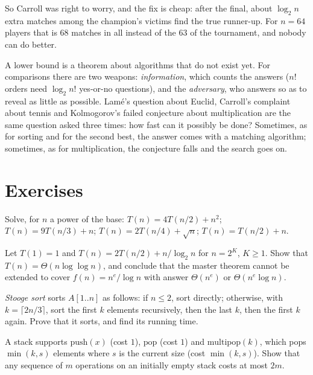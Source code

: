 So Carroll was right to worry, and the fix is cheap: after the final, about $\log_2n$ extra matches among the champion's victims find the true
runner-up. For $n=64$ players that is $68$ matches in all instead of the $63$ of the tournament, and nobody can do better.

\begin{beauty}
A lower bound is a theorem about algorithms that do not exist yet. For comparisons there are two weapons: \emph{information}, which counts
the answers ($n!$ orders need $\log_2n!$ yes-or-no questions), and the \emph{adversary}, who answers so as to reveal as little as possible.
Lam\'e's question about Euclid, Carroll's complaint about tennis and Kolmogorov's failed conjecture about multiplication are the same
question asked three times: how fast can it possibly be done? Sometimes, as for sorting and for the second best, the answer comes with a
matching algorithm; sometimes, as for multiplication, the conjecture falls and the search goes on.
\end{beauty}

\section{Exercises}

\begin{exercise}[$\star$]\label{ex:recsolve}
Solve, for $n$ a power of the base: $T(n)=4T(n/2)+n^2$; $T(n)=9T(n/3)+n$; $T(n)=2T(n/4)+\sqrt n$; $T(n)=T(n/2)+n$.
\end{exercise}

\begin{exercise}[$\star$]\label{ex:gap}
Let $T(1)=1$ and $T(n)=2T(n/2)+n/\log_2n$ for $n=2^K$, $K\ge1$. Show that $T(n)=\Theta(n\log\log n)$, and conclude that the master theorem
cannot be extended to cover $f(n)=n^e/\log n$ with answer $\Theta(n^e)$ or $\Theta(n^e\log n)$.
\end{exercise}

\begin{exercise}[$\star\star$]\label{ex:stooge}
\emph{Stooge sort} sorts $A[1..n]$ as follows: if $n\le2$, sort directly; otherwise, with $k=\lceil2n/3\rceil$, sort the first $k$ elements
recursively, then the last $k$, then the first $k$ again. Prove that it sorts, and find its running time.
\end{exercise}

\begin{exercise}[$\star$]\label{ex:multipop}
A stack supports $\mathrm{push}(x)$ (cost $1$), $\mathrm{pop}$ (cost $1$) and $\mathrm{multipop}(k)$, which pops $\min(k,s)$ elements where $s$ is the
current size (cost $\min(k,s)$). Show that any sequence of $m$ operations on an initially empty stack costs at most $2m$.
\end{exercise}


